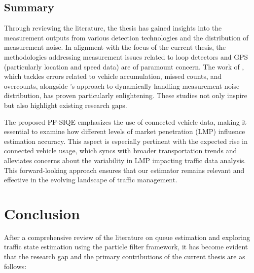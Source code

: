 \subsection{Summary}
Through reviewing the literature, the thesis has gained insights into the measurement outputs from various detection technologies and the distribution of measurement noise. In alignment with the focus of the current thesis, the methodologies addressing measurement issues related to loop detectors and GPS (particularly location and speed data) are of paramount concern. The work of \textcite{xie2018generic}, which tackles errors related to vehicle accumulation, missed counts, and overcounts, alongside \textcite{aljamal2020real}'s approach to dynamically handling measurement noise distribution, has proven particularly enlightening. These studies not only inspire but also highlight existing research gaps.

The proposed PF-SIQE emphasizes the use of connected vehicle data, making it essential to examine how different levels of market penetration (LMP) influence estimation accuracy. This aspect is especially pertinent with the expected rise in connected vehicle usage, which syncs with broader transportation trends and alleviates concerns about the variability in LMP impacting traffic data analysis. This forward-looking approach ensures that our estimator remains relevant and effective in the evolving landscape of traffic management.

\section{Conclusion}\label{LR: Conclusion}
After a comprehensive review of the literature on queue estimation and exploring traffic state estimation using the particle filter framework, it has become evident that the research gap and the primary contributions of the current thesis are as follows:

